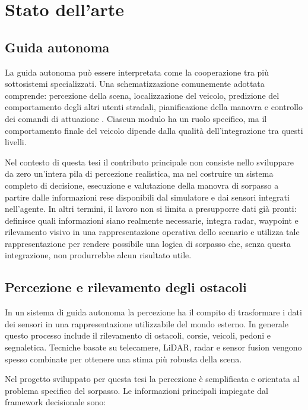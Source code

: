 \chapter{Stato dell'arte}

\section{Guida autonoma}

La guida autonoma può essere interpretata come la cooperazione tra più sottosistemi specializzati. Una schematizzazione comunemente adottata comprende: percezione della scena, localizzazione del veicolo, predizione del comportamento degli altri utenti stradali, pianificazione della manovra e controllo dei comandi di attuazione \cite{paden2016survey}. Ciascun modulo ha un ruolo specifico, ma il comportamento finale del veicolo dipende dalla qualità dell'integrazione tra questi livelli.

Nel contesto di questa tesi il contributo principale non consiste nello sviluppare da zero un'intera pila di percezione realistica, ma nel costruire un sistema completo di decisione, esecuzione e valutazione della manovra di sorpasso a partire dalle informazioni rese disponibili dal simulatore e dai sensori integrati nell'agente. In altri termini, il lavoro non si limita a presupporre dati già pronti: definisce quali informazioni siano realmente necessarie, integra radar, waypoint e rilevamento visivo in una rappresentazione operativa dello scenario e utilizza tale rappresentazione per rendere possibile una logica di sorpasso che, senza questa integrazione, non produrrebbe alcun risultato utile.

\section{Percezione e rilevamento degli ostacoli}

In un sistema di guida autonoma la percezione ha il compito di trasformare i dati dei sensori in una rappresentazione utilizzabile del mondo esterno. In generale questo processo include il rilevamento di ostacoli, corsie, veicoli, pedoni e segnaletica. Tecniche basate su telecamere, LiDAR, radar e sensor fusion vengono spesso combinate per ottenere una stima più robusta della scena.

Nel progetto sviluppato per questa tesi la percezione è semplificata e orientata al problema specifico del sorpasso. Le informazioni principali impiegate dal framework decisionale sono:

